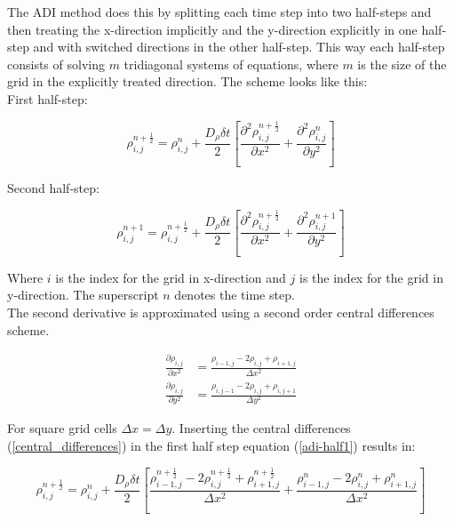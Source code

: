 \documentclass[11pt,a4paper]{article} %
\begin{document}
The ADI method does this by splitting each time step into two half-steps and then treating the x-direction implicitly and the y-direction explicitly in one half-step and with switched directions in the other half-step. This way each half-step consists of solving $m$ tridiagonal systems of equations, where $m$ is the size of the grid in the explicitly treated direction. The scheme looks like this: \\

First half-step:

\begin{equation} \label{adi-half1}
\rho_{i,j}^{n+\frac{1}{2}} = \rho_{i,j}^n + \frac{D_\rho \delta t}{2} \left[ \frac{\partial^2 \rho_{i,j}^{n+\frac{1}{2}}}{\partial x^2} + \frac{\partial^2 \rho_{i,j}^n}{\partial y^2} \right]
\end{equation}

Second half-step:

\begin{equation} \label{adi-half2}
\rho_{i,j}^{n+1} = \rho_{i,j}^{n+\frac{1}{2}} + \frac{D_\rho \delta t}{2} \left[ \frac{\partial^2 \rho_{i,j}^{n+\frac{1}{2}}}{\partial x^2} + \frac{\partial^2 \rho_{i,j}^{n+1}}{\partial y^2} \right]
\end{equation}

Where $i$ is the index for the grid in x-direction and $j$ is the index for the grid in y-direction. The superscript $n$ denotes the time step. \\

The second derivative is approximated using a second order central differences scheme.

\begin{equation} \label{central_differences}
\begin{aligned}
	\frac{\partial \rho_{i,j}}{\partial x^2} &= \frac{\rho_{i-1,j} - 2 \rho_{i,j} + \rho_{i+1,j}}{\Delta x^2} \\
	\frac{\partial \rho_{i,j}}{\partial y^2} &= \frac{\rho_{i,j-1} - 2 \rho_{i,j} + \rho_{i,j+1}}{\Delta y^2}
\end{aligned}
\end{equation}

For square grid cells $ \Delta x = \Delta y $.
Inserting the central differences (\ref{central_differences}) in the first half step equation (\ref{adi-half1}) results in:

\begin{equation} \label{adi_half1_complete}
\rho_{i,j}^{n+\frac{1}{2}} = \rho_{i,j}^n + \frac{D_\rho \delta t}{2} \left[ \frac{\rho_{i-1,j}^{n+\frac{1}{2}} - 2 \rho_{i,j}^{n+\frac{1}{2}} + \rho_{i+1,j}^{n+\frac{1}{2}}}{\Delta x^2} + \frac{\rho_{i-1,j}^n - 2 \rho_{i,j}^n + \rho_{i+1,j}^n}{\Delta x^2} \right]
\end{equation}
\end{document}
